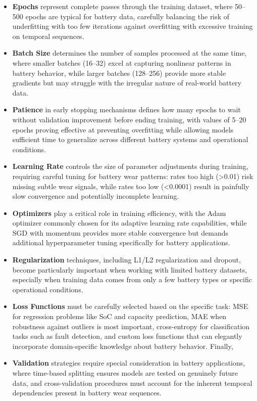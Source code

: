 \begin{itemize}
    \item \textbf{Epochs} represent complete passes through the training dataset, where 50--500 epochs are typical for battery data, carefully balancing the risk of underfitting with too few iterations against overfitting with excessive training on temporal sequences.
    \item \textbf{Batch Size} determines the number of samples processed at the same time, where smaller batches (16--32) excel at capturing nonlinear patterns in battery behavior, while larger batches (128--256) provide more stable gradients but may struggle with the irregular nature of real-world battery data.
    \item \textbf{Patience} in early stopping mechanisms defines how many epochs to wait without validation improvement before ending training, with values of 5--20 epochs proving effective at preventing overfitting while allowing models sufficient time to generalize across different battery systems and operational conditions.
    \item \textbf{Learning Rate} controls the size of parameter adjustments during training, requiring careful tuning for battery wear patterns: rates too high (>0.01) risk missing subtle wear signals, while rates too low (<0.0001) result in painfully slow convergence and potentially incomplete learning.
    \item \textbf{Optimizers} play a critical role in training efficiency, with the Adam optimizer commonly chosen for its adaptive learning rate capabilities, while SGD with momentum provides more stable convergence but demands additional hyperparameter tuning specifically for battery applications.
    \item \textbf{Regularization} techniques, including L1/L2 regularization and dropout, become particularly important when working with limited battery datasets, especially when training data comes from only a few battery types or specific operational conditions.
     \item \textbf{Loss Functions} must be carefully selected based on the specific task: MSE for regression problems like SoC and capacity prediction, MAE when robustness against outliers is most important, cross-entropy for classification tasks such as fault detection, and custom loss functions that can elegantly incorporate domain-specific knowledge about battery behavior. Finally,
    \item \textbf{Validation} strategies require special consideration in battery applications, where time-based splitting ensures models are tested on genuinely future data, and cross-validation procedures must account for the inherent temporal dependencies present in battery wear sequences.
\end{itemize}


